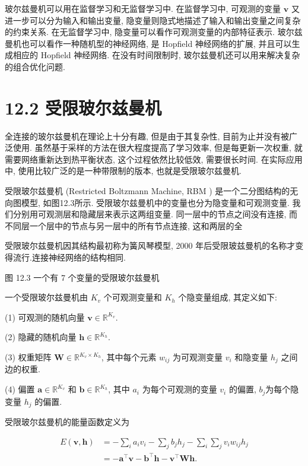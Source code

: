 \documentclass[10pt]{article}
\begin{document}
玻尔兹曼机可以用在监督学习和无监督学习中. 在监督学习中, 可观测的变量 $\boldsymbol{v}$ 又进一步可以分为输入和输出变量, 隐变量则隐式地描述了输入和输出变量之间复杂的约束关系. 在无监督学习中, 隐变量可以看作可观测变量的内部特征表示. 玻尔兹曼机也可以看作一种随机型的神经网络, 是 Hopfield 神经网络的扩展, 并且可以生成相应的 Hopfield 神经网络. 在没有时间限制时, 玻尔兹曼机还可以用来解决复杂的组合优化问题.

\section*{12.2 受限玻尔兹曼机}
全连接的玻尔兹曼机在理论上十分有趣, 但是由于其复杂性, 目前为止并没有被广泛使用. 虽然基于采样的方法在很大程度提高了学习效率, 但是每更新一次权重, 就需要网络重新达到热平衡状态, 这个过程依然比较低效, 需要很长时间. 在实际应用中, 使用比较广泛的是一种带限制的版本, 也就是受限玻尔兹曼机.

受限玻尔兹曼机 (Restricted Boltzmann Machine, RBM ) 是一个二分图结构的无向图模型, 如图12.3所示. 受限玻尔兹曼机中的变量也分为隐变量和可观测变量. 我们分别用可观测层和隐藏层来表示这两组变量. 同一层中的节点之间没有连接, 而不同层一个层中的节点与另一层中的所有节点连接, 这和两层的全

受限玻尔兹曼机因其结构最初称为簧风琴模型, 2000 年后受限玻兹曼机的名称才变得流行.连接神经网络的结构相同.



图 12.3 一个有 7 个变量的受限玻尔兹曼机

一个受限玻尔兹曼机由 $K_{v}$ 个可观测变量和 $K_{h}$ 个隐变量组成, 其定义如下:

(1) 可观测的随机向量 $\boldsymbol{v} \in \mathbb{R}^{K_{v}}$.

(2) 隐藏的随机向量 $\boldsymbol{h} \in \mathbb{R}^{K_{h}}$.

(3) 权重矩阵 $\boldsymbol{W} \in \mathbb{R}^{K_{v} \times K_{h}}$, 其中每个元素 $w_{i j}$ 为可观测变量 $v_{i}$ 和隐变量 $h_{j}$ 之间边的权重.

(4) 偏置 $\boldsymbol{a} \in \mathbb{R}^{K_{v}}$ 和 $\boldsymbol{b} \in \mathbb{R}^{K_{h}}$, 其中 $a_{i}$ 为每个可观测的变量 $v_{i}$ 的偏置, $b_{j}$为每个隐变量 $h_{j}$ 的偏置.

受限玻尔兹曼机的能量函数定义为


\begin{align*}
E(\boldsymbol{v}, \boldsymbol{h}) & =-\sum_{i} a_{i} v_{i}-\sum_{j} b_{j} h_{j}-\sum_{i} \sum_{j} v_{i} w_{i j} h_{j}  \tag{12.27}\\
& =-\boldsymbol{a}^{\top} \boldsymbol{v}-\boldsymbol{b}^{\top} \boldsymbol{h}-\boldsymbol{v}^{\top} \boldsymbol{W} \boldsymbol{h} . \tag{12.28}
\end{align*}
\end{document}
